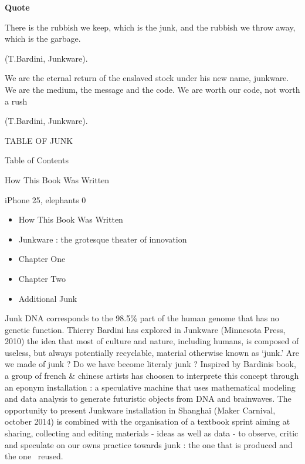 \clearpage\setcounter{page}{1}\pagestyle{HTML}
{\bfseries
Quote}

{\textquotedbl}There is the rubbish we keep, which is the junk, and the
rubbish we throw away, which is the garbage.{\textquotedbl} 

(T.Bardini, Junkware).


\bigskip

{\textquotedbl}We are the eternal return of the enslaved stock under his
new name, junkware.\newline
We are the medium, the message and the code.\newline
We are worth our code, not worth a rush{\textquotedbl}

(T.Bardini, Junkware).

TABLE OF JUNK

 Table of Contents

 How This Book Was Written

 iPhone 25, elephants 0

\liststyleLi
\begin{itemize}
\item How This Book Was Written 
\item Junkware : the grotesque theater of innovation 
\item Chapter One 
\item Chapter Two 
\item Additional Junk
\end{itemize}

Junk DNA corresponds to the 98.5\% part of the human genome that has no
genetic function. Thierry Bardini has explored in Junkware (Minnesota
Press, 2010) the idea that {\textquotedbl}most of culture and nature,
including humans, is composed of useless, but always potentially
recyclable, material otherwise known as
{\textquoteleft}junk.{\textquoteright} {\textquotedbl}\newline
Are we made of junk ? Do we have become literaly junk ? \newline
\newline
Inspired by Bardini{\textquotesingle}s book, a group of french \&
chinese artists has choosen to interprete this concept through an
eponym installation : a speculative machine that uses mathematical
modeling and data analysis to generate futuristic objects from DNA and
brainwaves. \newline
\newline
The opportunity to present Junkware installation in Shangha\"i (Maker
Carnival, october 2014) is combined with the organisation of a textbook
sprint aiming at sharing, collecting and editing materials - ideas as
well as data - to observe, critic and speculate on our
own{\textquotesingle}s practice towards junk : the one that is produced
and the one~ reused. 

